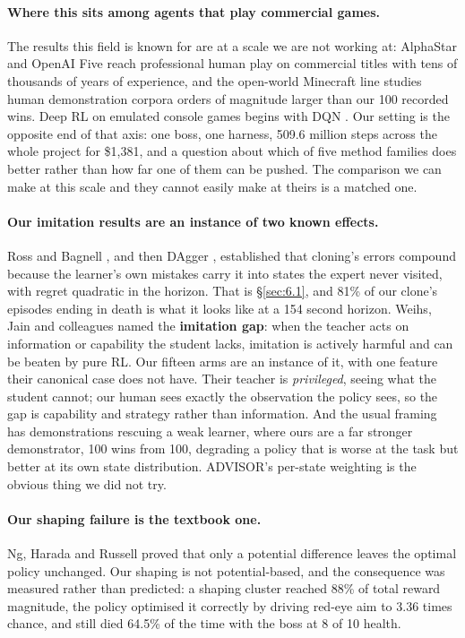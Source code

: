 \documentclass[11pt]{article}
\begin{document}
\paragraph{Where this sits among agents that play commercial games.} The results this field is known for are at a scale we are not working at: AlphaStar \cite{vinyals2019alphastar} and OpenAI Five \cite{openai2019dota} reach professional human play on commercial titles with tens of thousands of years of experience, and the open-world Minecraft line \cite{guss2019minerl,fan2022minedojo} studies human demonstration corpora orders of magnitude larger than our 100 recorded wins. Deep RL on emulated console games begins with DQN \cite{mnih2015dqn}. Our setting is the opposite end of that axis: one boss, one harness, 509.6 million steps across the whole project for \$1,381, and a question about which of five method families does better rather than how far one of them can be pushed. The comparison we can make at this scale and they cannot easily make at theirs is a matched one.

\paragraph{Our imitation results are an instance of two known effects.} Ross and Bagnell \cite{ross2010reductions}, and then DAgger \cite{ross2011dagger}, established that cloning's errors compound because the learner's own mistakes carry it into states the expert never visited, with regret quadratic in the horizon. That is \S\ref{sec:6.1}, and 81\% of our clone's episodes ending in death is what it looks like at a 154 second horizon. Weihs, Jain and colleagues \cite{weihs2021advisor} named the \textbf{imitation gap}: when the teacher acts on information or capability the student lacks, imitation is actively harmful and can be beaten by pure RL. Our fifteen arms are an instance of it, with one feature their canonical case does not have. Their teacher is \emph{privileged}, seeing what the student cannot; our human sees exactly the observation the policy sees, so the gap is capability and strategy rather than information. And the usual framing has demonstrations rescuing a weak learner, where ours are a far stronger demonstrator, 100 wins from 100, degrading a policy that is worse at the task but better at its own state distribution. ADVISOR's per-state weighting is the obvious thing we did not try.

\paragraph{Our shaping failure is the textbook one.} Ng, Harada and Russell \cite{ng1999shaping} proved that only a potential difference leaves the optimal policy unchanged. Our shaping is not potential-based, and the consequence was measured rather than predicted: a shaping cluster reached 88\% of total reward magnitude, the policy optimised it correctly by driving red-eye aim to 3.36 times chance, and still died 64.5\% of the time with the boss at 8 of 10 health.
\end{document}
